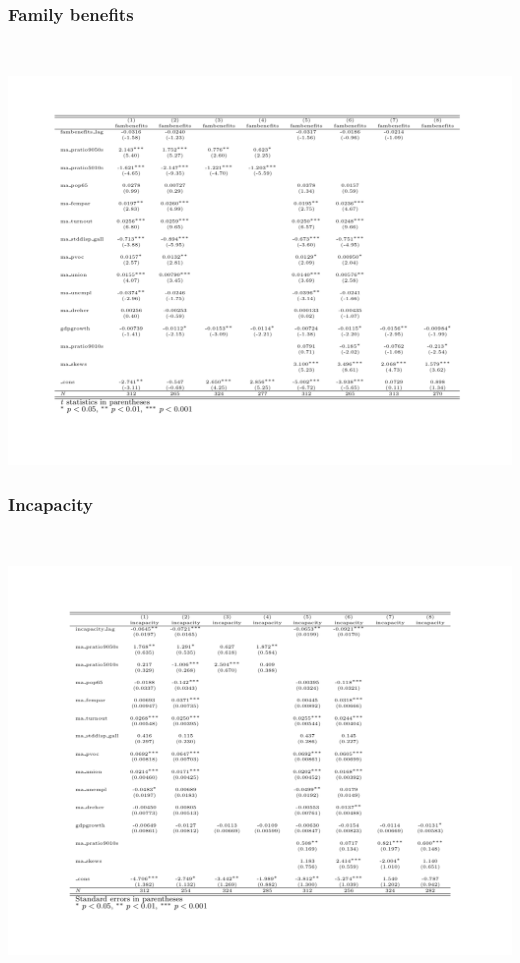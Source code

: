 \documentclass{beamer}
\begin{document}
\begin{frame}
\begin{itemize}
\begin{frame}
\frametitle{Family benefits}\
\begin{center}
\includegraphics[scale=0.35]{family}
\end{center}
\end{frame}


\begin{frame}
\frametitle{Incapacity}\
\begin{center}
\includegraphics[scale=0.35]{incapacity}
\end{center}
\end{frame}


\end{itemize}
\end{frame}
\end{document}
